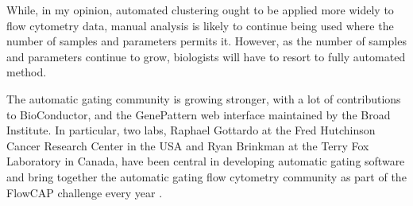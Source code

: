 
While, in my opinion, automated clustering ought to be applied more widely to flow cytometry data, manual analysis is likely to continue being used where the number of samples and parameters permits it.
However, as the number of samples and parameters continue to grow, biologists will have to resort to fully automated method.

The automatic gating community is growing stronger, with a lot of contributions to BioConductor, and the GenePattern web interface maintained by the Broad Institute.
In particular, two labs, Raphael Gottardo at the Fred Hutchinson Cancer Research Center in the USA and Ryan Brinkman at the Terry Fox Laboratory in Canada, have been central in developing automatic gating software and bring together the automatic gating flow cytometry community as part of the FlowCAP challenge every year \citep{Aghaeepour:2013dg}.




